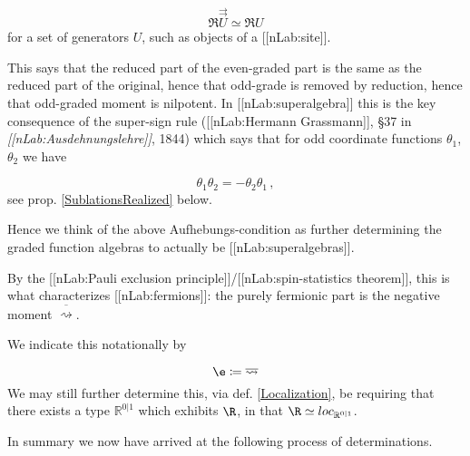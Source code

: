 \documentclass[12pt,titlepage]{article}
\theoremstyle{plain}
\theoremstyle{definition}
\theoremstyle{remark}
\begin{document}
\begin{displaymath}
\Re \stackrel{\rightrightarrows}{U} \simeq \Re U
\end{displaymath}
for a set of generators $U$, such as objects of a [[nLab:site]].

This says that the reduced part of the even-graded part is the same as the reduced part of the original, hence that odd-grade is removed by reduction, hence that odd-graded moment is nilpotent. In [[nLab:superalgebra]] this is the key consequence of the super-sign rule ([[nLab:Hermann Grassmann]], §37 in \emph{[[nLab:Ausdehnungslehre]]}, 1844) which says that for odd coordinate functions $\theta_1$, $\theta_2$ we have

\begin{displaymath}
\theta_1 \theta_2 = -\theta_2 \theta_1
  \,,
\end{displaymath}
see prop. \ref{SublationsRealized} below.

Hence we think of the above Aufhebungs-condition as further determining the graded function algebras to actually be [[nLab:superalgebras]].

By the [[nLab:Pauli exclusion principle]]/[[nLab:spin-statistics theorem]], this is what characterizes [[nLab:fermions]]: the purely fermionic part is the negative moment $\overline{\rightsquigarrow}$.

We indicate this notationally by

\begin{displaymath}
\e \coloneqq \overline{\rightsquigarrow}
\end{displaymath}
We may still further determine this, via def. \ref{Localization}, be requiring that there exists a type $\mathbb{R}^{0|1}$ which exhibits $\R$, in that $\R \simeq loc_{\mathbb{R}^{0|1}}$.

In summary we now have arrived at the following process of determinations.
\end{document}
